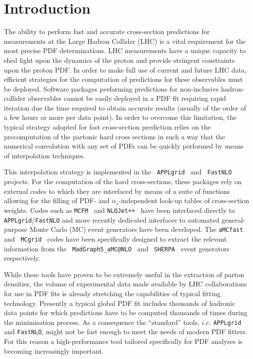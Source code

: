 \documentclass[preprint,12pt]{elsarticle}
\begin{document}
\clearpage


\section{Introduction}\label{sec:intro}

The ability to perform fast and accurate cross-section predictions for
measurements at the Large Hadron Collider (LHC) is a vital requirement
for the most precise PDF determinations. LHC measurements have a
unique capacity to shed light upon the dynamics of the proton and
provide stringent constraints upon the proton PDF. In order to make
full use of current and future LHC data, efficient strategies for the
computation of predictions for these observables must be
deployed. Software packages performing predictions for non-inclusive
hadron-collider observables cannot be easily deployed in a PDF fit
requiring rapid iteration due the time required to obtain accurate
results (usually of the order of a few hours or more per data
point). In order to overcome this limitation, the typical strategy
adopted for fast cross-section prediction relies on the precomputation
of the partonic hard cross sections in such a way that the numerical
convolution with any set of PDFs can be quickly performed by means of
interpolation techniques.

This interpolation strategy is implemented in the {\tt
  APPLgrid}~\cite{Carli:2010rw} and {\tt
  FastNLO}~\cite{Wobisch:2011ij} projects. For the computation of the
hard cross-sections, these packages rely on external codes to which
they are interfaced by means of a suite of functions allowing for the
filling of PDF- and $\alpha_s$-independent look-up tables of
cross-section weights. Codes such as {\tt MCFM}~\cite{Campbell:2010ff}
and {\tt NLOJet++}~\cite{Nagy:2003tz} have been interfaced directly to
{\tt APPLgrid}/{\tt FastNLO} and more recently dedicated interfaces to
automated general-purpose Monte Carlo (MC) event generators have been
developed. The {\tt aMCfast}~\cite{Bertone:2014zva} and {\tt
  MCgrid}~\cite{DelDebbio:2013kxa} codes have been specifically
designed to extract the relevant information from the {\tt
  MadGraph5\_aMC@NLO}~\cite{Alwall:2014hca} and {\tt
  SHERPA}~\cite{Gleisberg:2008ta} event generators respectively.

While these tools have proven to be extremely useful in the extraction
of parton densities, the volume of experimental data made available by
LHC collaborations for use in PDF fits is already stretching the
capabilities of typical fitting technology. Presently a typical global
PDF fit includes thousands of hadronic data points for which
predictions have to be computed thousands of times during the
minimisation process. As a consequence the ``standard'' tools, $i.e.$
{\tt APPLgrid} and {\tt FastNLO}, might not be fast enough to meet the
needs of modern PDF fitters. For this reason a high-performance tool
tailored specifically for PDF analyses is becoming increasingly
important.
\end{document}
